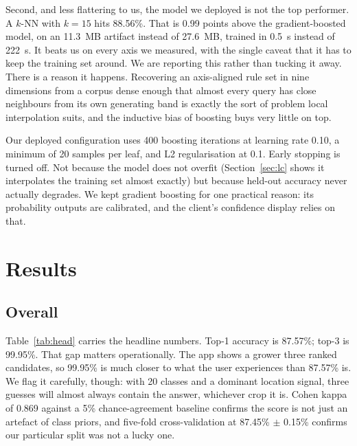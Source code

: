 \documentclass[conference]{IEEEtran}
\begin{document}
Second, and less flattering to us, the model we deployed is not the top
performer. A $k$-NN with $k = 15$ hits 88.56\%. That is 0.99 points above the
gradient-boosted model, on an 11.3~MB artifact instead of 27.6~MB, trained in
0.5~s instead of 222~s. It beats us on every axis we measured, with the
single caveat that it has to keep the training set around. We are reporting
this rather than tucking it away. There is a reason it happens. Recovering an
axis-aligned rule set in nine dimensions from a corpus dense enough that
almost every query has close neighbours from its own generating band is
exactly the sort of problem local interpolation suits, and the inductive
bias of boosting buys very little on top.

Our deployed configuration uses 400 boosting iterations at learning rate
0.10, a minimum of 20 samples per leaf, and L2 regularisation at 0.1. Early
stopping is turned off. Not because the model does not overfit
(Section~\ref{sec:lc} shows it interpolates the training set almost exactly)
but because held-out accuracy never actually degrades. We kept gradient
boosting for one practical reason: its probability outputs are calibrated,
and the client's confidence display relies on that.

\section{Results}

\subsection{Overall}
Table~\ref{tab:head} carries the headline numbers. Top-1 accuracy is
87.57\%; top-3 is 99.95\%. That gap matters operationally. The app shows a
grower three ranked candidates, so 99.95\% is much closer to what the user
experiences than 87.57\% is. We flag it carefully, though: with 20 classes
and a dominant location signal, three guesses will almost always contain the
answer, whichever crop it is. Cohen kappa \cite{cohen1960} of 0.869 against
a 5\% chance-agreement baseline confirms the score is not just an artefact
of class priors, and five-fold cross-validation at 87.45\% $\pm$ 0.15\%
confirms our particular split was not a lucky one.
\end{document}
